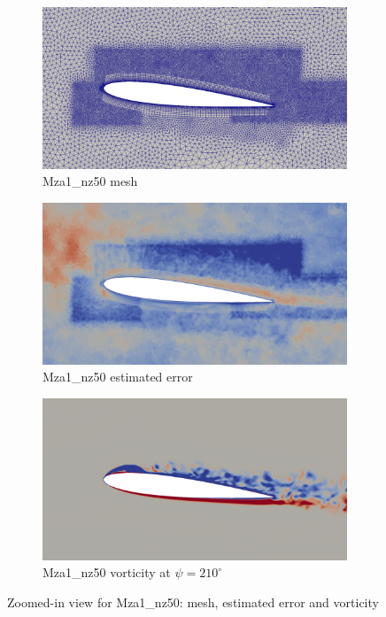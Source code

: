 \begin{figure}[H]
	\centering
\begin{subfigure}[b]{0.7\textwidth}
	\centering
	\includegraphics[width=1\textwidth]{figures/adapt_strat/zoomed/Mza1_mesh.png}
	\caption{Mza1\_nz50 mesh}
	\label{fig:Mza1_mesh_zoomed}
\end{subfigure}
\begin{subfigure}[b]{0.7\textwidth}
	\centering
	\includegraphics[width=1\textwidth]{figures/adapt_strat/zoomed/Mza1_error.png}
	\caption{Mza1\_nz50 estimated error}
	\label{fig:Mza1_max_error_zoomed}
\end{subfigure}
\begin{subfigure}[b]{0.7\textwidth}
	\centering
	\includegraphics[width=1\textwidth]{figures/adapt_strat/zoomed/Mza1_ph_210.png}
	\caption{Mza1\_nz50 vorticity at $\psi=210^\circ$}
	\label{fig:Mza1_vorticity_zoomed}
\end{subfigure}
\caption{Zoomed-in view for Mza1\_nz50: mesh, estimated error and vorticity}
\label{fig:Mza1_zoomed}
\end{figure}

